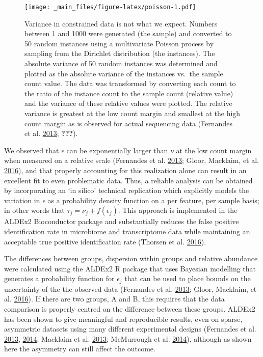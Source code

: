 \documentclass[onecolumn]{book}
\theoremstyle{definition}
\theoremstyle{definition}
\theoremstyle{definition}
\theoremstyle{remark}
\begin{document}
\begin{figure}
\centering
\texttt{[image: \_main\_files/figure-latex/poisson-1.pdf]}
\caption{\label{fig:poisson}Variance in constrained data is not what we
expect. Numbers between 1 and 1000 were generated (the sample) and
converted to 50 random instances using a multivariate Poisson process by
sampling from the Dirichlet distribution (the instances). The absolute
variance of 50 random instances was determined and plotted as the
absolute variance of the instances vs.~the sample count value. The data
was transformed by converting each count to the ratio of the instance
count to the sample count (relative value) and the variance of these
relative values were plotted. The relative variance is greatest at the
low count margin and smallest at the high count margin as is observed
for actual sequencing data (Fernandes et al.
\protect\hyperlink{ref-fernandes:2013}{2013}; {\textbf{???}}).}
\end{figure}

We observed that \(\epsilon\) can be exponentially larger than \(\nu\)
at the low count margin when measured on a relative scale (Fernandes et
al. \protect\hyperlink{ref-fernandes:2013}{2013}; Gloor, Macklaim, et
al. \protect\hyperlink{ref-gloorAJS:2016}{2016}), and that properly
accounting for this realization alone can result in an excellent fit to
even problematic data. Thus, a reliable analysis can be obtained by
incorporating an `in silico' technical replication which explicitly
models the variation in \(\epsilon\) as a probability density function
on a per feature, per sample basis; in other words that
\(\tau_{j} = \nu_j + f(\epsilon_{j})\). This approach is implemented in
the ALDEx2 Bioconductor package and substantially reduces the false
positive identification rate in microbiome and transcriptome data while
maintaining an acceptable true positive identification rate (Thorsen et
al. \protect\hyperlink{ref-Thorsen:2016aa}{2016}).

The differences between groups, dispersion within groups and relative
abundance were calculated using the ALDEx2 R package that uses Bayesian
modelling that generates a probability function for \(\epsilon_j\) that
can be used to place bounds on the uncertainty of the the observed data
(Fernandes et al. \protect\hyperlink{ref-fernandes:2013}{2013}; Gloor,
Macklaim, et al. \protect\hyperlink{ref-gloorAJS:2016}{2016}). If there
are two groups, A and B, this requires that the data comparison is
properly centred on the difference between these groups. ALDEx2 has been
shown to give meaningful and reproducible results, even on sparse,
asymmetric datasets using many different experimental designs (Fernandes
et al. \protect\hyperlink{ref-fernandes:2013}{2013},
\protect\hyperlink{ref-fernandes:2014}{2014}; Macklaim et al.
\protect\hyperlink{ref-macklaim:2013}{2013}; McMurrough et al.
\protect\hyperlink{ref-mcmurrough:2014}{2014}), although as shown here
the asymmetry can still affect the outcome.
\end{document}
